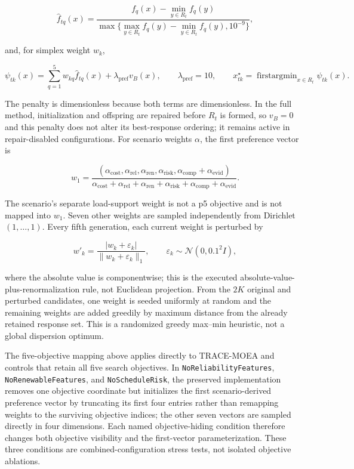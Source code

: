 \documentclass[energies,article,submit,moreauthors]{Definitions/mdpi}
\begin{document}
\[
\hat f_{tq}(x)=
\frac{f_q(x)-\min_{y\in R_t}f_q(y)}
{\max\{\max_{y\in R_t}f_q(y)-\min_{y\in R_t}f_q(y),10^{-9}\}},
\]

and, for simplex weight \(w_k\),

\[
\psi_{tk}(x)=\sum_{q=1}^{5}w_{kq}\hat f_{tq}(x)
+\lambda_{\mathrm{pref}}v_B(x),\qquad
\lambda_{\mathrm{pref}}=10,
\qquad x_{tk}^\star=\operatorname{firstargmin}_{x\in R_t}\psi_{tk}(x).
\]

The penalty is dimensionless because both terms are dimensionless. In the full method, initialization and offspring are repaired before \(R_t\) is formed, so \(v_B=0\) and this penalty does not alter its best-response ordering; it remains active in repair-disabled configurations. For scenario weights \(\alpha\), the first preference vector is

\[
w_1=\frac{(\alpha_{\mathrm{cost}},\alpha_{\mathrm{rel}},
\alpha_{\mathrm{ren}},\alpha_{\mathrm{risk}},
\alpha_{\mathrm{comp}}+\alpha_{\mathrm{evid}})}
{\alpha_{\mathrm{cost}}+\alpha_{\mathrm{rel}}+\alpha_{\mathrm{ren}}+
\alpha_{\mathrm{risk}}+\alpha_{\mathrm{comp}}+\alpha_{\mathrm{evid}}}.
\]

The scenario's separate load-support weight is not a p5 objective and is not mapped into \(w_1\). Seven other weights are sampled independently from Dirichlet\((1,\ldots,1)\). Every fifth generation, each current weight is perturbed by

\[
w'_k=\frac{|w_k+\varepsilon_k|}{\|w_k+\varepsilon_k\|_1},\qquad
\varepsilon_k\sim\mathcal N(0,0.1^2I),
\]

where the absolute value is componentwise; this is the executed absolute-value-plus-renormalization rule, not Euclidean projection. From the \(2K\) original and perturbed candidates, one weight is seeded uniformly at random and the remaining weights are added greedily by maximum distance from the already retained response set. This is a randomized greedy max--min heuristic, not a global dispersion optimum.

The five-objective mapping above applies directly to TRACE-MOEA and controls that retain all five search objectives. In \texttt{NoReliabilityFeatures}, \texttt{NoRenewableFeatures}, and \texttt{NoScheduleRisk}, the preserved implementation removes one objective coordinate but initializes the first scenario-derived preference vector by truncating its first four entries rather than remapping weights to the surviving objective indices; the other seven vectors are sampled directly in four dimensions. Each named objective-hiding condition therefore changes both objective visibility and the first-vector parameterization. These three conditions are combined-configuration stress tests, not isolated objective ablations.
\end{document}
